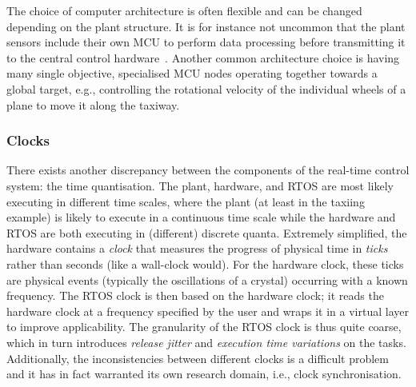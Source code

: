 The choice of computer architecture is often flexible and can be changed depending on the plant structure.
It is for instance not uncommon that the plant sensors include their own MCU to perform data processing before transmitting it to the central control hardware~\addref{}.
Another common architecture choice is having many single objective, specialised MCU nodes operating together towards a global target, e.g., controlling the rotational velocity of the individual wheels of a plane to move it along the taxiway.

\subsubsection{Clocks}%
%
There exists another discrepancy between the components of the real-time control system: the time quantisation.
The plant, hardware, and RTOS are most likely executing in different time scales, where the plant (at least in the taxiing example) is likely to execute in a continuous time scale while the hardware and RTOS are both executing in (different) discrete quanta.
Extremely simplified, the hardware contains a \emph{clock} that measures the progress of physical time in \emph{ticks} rather than seconds (like a wall-clock would).
For the hardware clock, these ticks are physical events (typically the oscillations of a crystal) occurring with a known frequency.
The RTOS clock is then based on the hardware clock; it reads the hardware clock at a frequency specified by the user and wraps it in a virtual layer to improve applicability. 
The granularity of the RTOS clock is thus quite coarse, which in turn introduces \emph{release jitter} and \emph{execution time variations} on the tasks.
Additionally, the inconsistencies between different clocks is a difficult problem and it has in fact warranted its own research domain, i.e., clock synchronisation.

